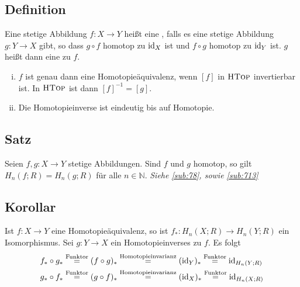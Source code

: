 \subsection[Definition: Homotopieäquivalenz und Homotopieinverse]{Definition} %
\label{sub:72}
Eine stetige Abbildung $f : X \to Y$ heißt eine , falls es eine stetige Abbildung $g : Y \to X$ gibt, so dass $g \circ f$ homotop zu $\operatorname{id}_X$ ist
und $f \circ g$ homotop zu $\operatorname{id}_Y$ ist. $g$ heißt dann eine  zu $f$.
\begin{enumerate}[(i)]
	\item $f$ ist genau dann eine Homotopieäquivalenz, wenn $[f]$ in $\textsc{HTop}$ invertierbar ist. In $\textsc{HTop}$ ist dann $[f]^{-1} = [g]$.
	\item Die Homotopieinverse ist eindeutig bis auf Homotopie.
\end{enumerate}

\subsection[Satz: Homotopieinvarianz der Homologie]{Satz} %
\label{sub:73}
Seien $f,g : X \to Y$ stetige Abbildungen. Sind $f$ und $g$ homotop, so gilt $H_n(f;R) = H_n(g;R)$ für alle $n \in \mathds{N}$.
\emph{Siehe \ref{sub:78}, sowie \ref{sub:713} } \bewende


\subsection[Korollar: Die induzierte Abbildung einer Homotopieäquivalenz ist ein Isomorphismus]{Korollar} %
\label{sub:74}
Ist $f : X \to Y$ eine Homotopieäquivalenz, so ist $f_* : H_n(X;R) \to H_n(Y;R)$ ein Isomorphismus.
Sei $g : Y \to X$ ein Homotopieinverses zu $f$. Es folgt 
\begin{align*}
	f_* \circ g_* &\stackrel{\text{Funktor}}{=} (f \circ g)_* \stackrel{\text{Homotopieinvarianz}}{=} (\operatorname{id}_Y)_* \stackrel{\text{Funktor}}{=} \operatorname{id}_{H_n(Y;R)} \\
	g_* \circ f_* &\stackrel{\text{Funktor}}{=} (g \circ f)_* \stackrel{\text{Homotopieinvarianz}}{=} (\operatorname{id}_X)_* \stackrel{\text{Funktor}}{=} \operatorname{id}_{H_n(X;R)}
\end{align*}

